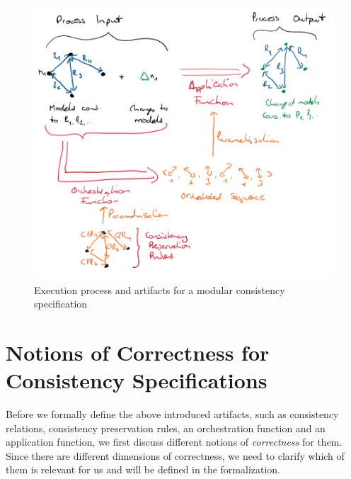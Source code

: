 \begin{figure}
    \centering
    \includegraphics[width=\textwidth]{figures/correctness/formal/execution_process.png}
    \caption[Modular consistency specification execution process and artifacts]{Execution process and artifacts for a modular consistency specification}
    \label{fig:correctness:execution_process}
\end{figure}



\section{Notions of Correctness for Consistency Specifications}




Before we formally define the above introduced artifacts, such as \glspl{consistency relation}, \glspl{consistency preservation rule}, an \gls{orchestration function} and an \gls{application function}, we first discuss different notions of \emph{correctness} for them.
Since there are different dimensions of correctness, we need to clarify which of them is relevant for us and will be defined in the formalization.

